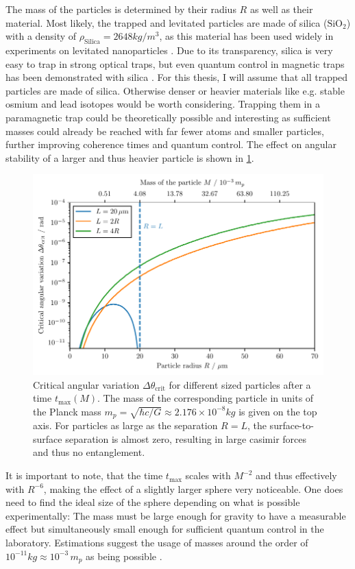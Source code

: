 The mass of the particles is determined by their radius $R$ as well as their material.
Most likely, the trapped and levitated particles are made of silica ($\mathrm{SiO_2}$) with a density of $\rho_\mathrm{Silica} = 2648\si{kg/m^3}$, as this material has been used widely in experiments on levitated nanoparticles \cite{Grass_2016,Slezak_2018}. Due to its transparency, silica is very easy to trap in strong optical traps, but even quantum control in magnetic traps has been demonstrated with silica \cite{Slezak_2018}.
For this thesis, I will assume that all trapped particles are made of silica. Otherwise denser or heavier materials like e.g. stable osmium and lead isotopes would be worth considering.
Trapping them in a paramagnetic trap could be theoretically possible and interesting as sufficient masses could already be reached with far fewer atoms and smaller particles, further improving coherence times and quantum control.
The effect on angular stability of a larger and thus heavier particle is shown in \cref{fig:4:theta-crit-mass}.
\begin{figure}[!htbp]
  \centering
  \includegraphics[width=\textwidth]{./../figures/theta-variance/theta-crit-mass.pdf}
  \caption{Critical angular variation $\Delta \theta_\mathrm{crit}$ for different sized particles after a time $t_\mathrm{max}(M)$. The mass of the corresponding particle in units of the Planck mass $m_p = \sqrt{\hbar c / G} \approx 2.176\times 10^{-8}\si{kg}$ is given on the top axis. For particles as large as the separation $R = L$, the surface-to-surface separation is almost zero, resulting in large casimir forces and thus no entanglement.}
  \label{fig:4:theta-crit-mass}
\end{figure}
It is important to note, that the time $t_\mathrm{max}$ scales with $M^{-2}$ and thus effectively with $R^{-6}$, making the effect of a slightly larger sphere very noticeable.
One does need to find the ideal size of the sphere depending on what is possible experimentally: The mass must be large enough for gravity to have a measurable effect but simultaneously small enough for sufficient quantum control in the laboratory. 
Estimations suggest the usage of masses around the order of $10^{-11}\si{kg} \approx 10^{-3}\,m_p$ as being possible \cite{Aspelmeyer_2024}.

